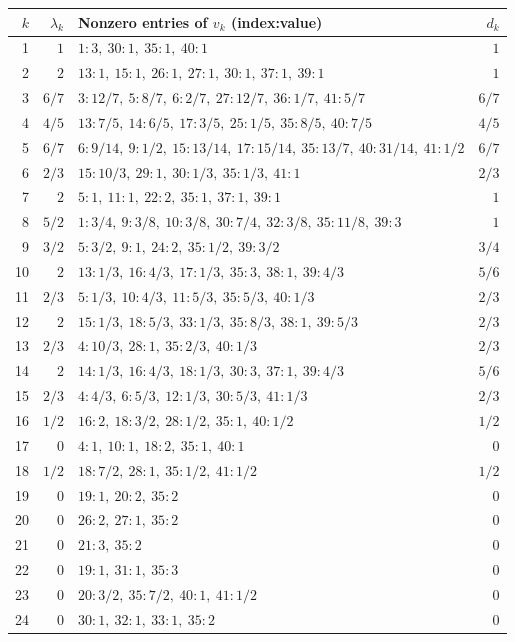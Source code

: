 \documentclass[11pt]{article}
\theoremstyle{definition}
\newcommand{\1}{\mathbf 1}
\begin{document}
\small
\begin{longtable}{r r p{} r}
\toprule $k$ & $\lambda_k$ & Nonzero entries of $v_k$ (index:value) & $d_k$\\
\midrule\endhead
1 & $1$ & $1:3,\ 30:1,\ 35:1,\ 40:1$ & $1$\\
2 & $2$ & $13:1,\ 15:1,\ 26:1,\ 27:1,\ 30:1,\ 37:1,\ 39:1$ & $1$\\
3 & $6/7$ & $3:12/7,\ 5:8/7,\ 6:2/7,\ 27:12/7,\ 36:1/7,\ 41:5/7$ & $6/7$\\
4 & $4/5$ & $13:7/5,\ 14:6/5,\ 17:3/5,\ 25:1/5,\ 35:8/5,\ 40:7/5$ & $4/5$\\
5 & $6/7$ & $6:9/14,\ 9:1/2,\ 15:13/14,\ 17:15/14,\ 35:13/7,\ 40:31/14,\ 41:1/2$ & $6/7$\\
6 & $2/3$ & $15:10/3,\ 29:1,\ 30:1/3,\ 35:1/3,\ 41:1$ & $2/3$\\
7 & $2$ & $5:1,\ 11:1,\ 22:2,\ 35:1,\ 37:1,\ 39:1$ & $1$\\
8 & $5/2$ & $1:3/4,\ 9:3/8,\ 10:3/8,\ 30:7/4,\ 32:3/8,\ 35:11/8,\ 39:3$ & $1$\\
9 & $3/2$ & $5:3/2,\ 9:1,\ 24:2,\ 35:1/2,\ 39:3/2$ & $3/4$\\
10 & $2$ & $13:1/3,\ 16:4/3,\ 17:1/3,\ 35:3,\ 38:1,\ 39:4/3$ & $5/6$\\
11 & $2/3$ & $5:1/3,\ 10:4/3,\ 11:5/3,\ 35:5/3,\ 40:1/3$ & $2/3$\\
12 & $2$ & $15:1/3,\ 18:5/3,\ 33:1/3,\ 35:8/3,\ 38:1,\ 39:5/3$ & $2/3$\\
13 & $2/3$ & $4:10/3,\ 28:1,\ 35:2/3,\ 40:1/3$ & $2/3$\\
14 & $2$ & $14:1/3,\ 16:4/3,\ 18:1/3,\ 30:3,\ 37:1,\ 39:4/3$ & $5/6$\\
15 & $2/3$ & $4:4/3,\ 6:5/3,\ 12:1/3,\ 30:5/3,\ 41:1/3$ & $2/3$\\
16 & $1/2$ & $16:2,\ 18:3/2,\ 28:1/2,\ 35:1,\ 40:1/2$ & $1/2$\\
17 & $0$ & $4:1,\ 10:1,\ 18:2,\ 35:1,\ 40:1$ & $0$\\
18 & $1/2$ & $18:7/2,\ 28:1,\ 35:1/2,\ 41:1/2$ & $1/2$\\
19 & $0$ & $19:1,\ 20:2,\ 35:2$ & $0$\\
20 & $0$ & $26:2,\ 27:1,\ 35:2$ & $0$\\
21 & $0$ & $21:3,\ 35:2$ & $0$\\
22 & $0$ & $19:1,\ 31:1,\ 35:3$ & $0$\\
23 & $0$ & $20:3/2,\ 35:7/2,\ 40:1,\ 41:1/2$ & $0$\\
24 & $0$ & $30:1,\ 32:1,\ 33:1,\ 35:2$ & $0$\\

\end{longtable}
\end{document}
